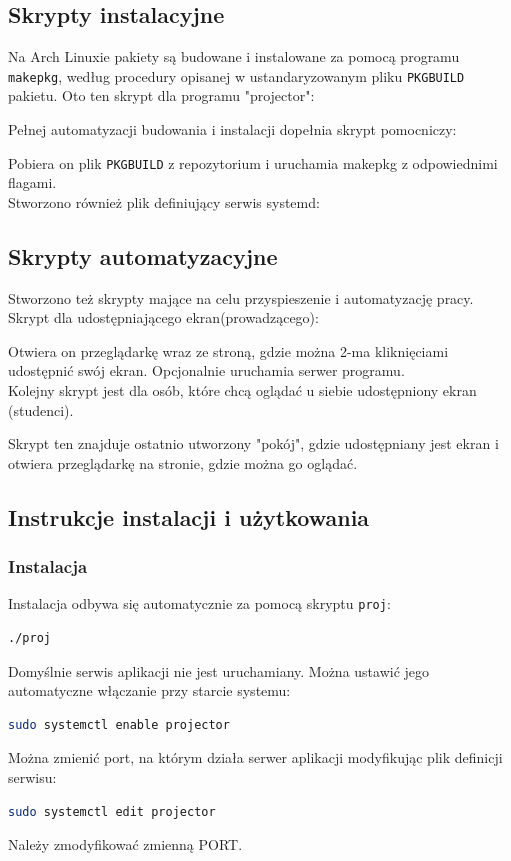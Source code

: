 \documentclass[a4paper,11pt]{article}
\begin{document}
        \subsection{Skrypty instalacyjne}
        Na Arch Linuxie pakiety są budowane i instalowane za pomocą programu \texttt{makepkg}, według procedury opisanej w ustandaryzowanym pliku \texttt{PKGBUILD} pakietu. 
        Oto ten skrypt dla programu "projector":
        
        \newpage
        Pełnej automatyzacji budowania i instalacji dopełnia skrypt pomocniczy:
        
        Pobiera on plik \texttt{PKGBUILD} z repozytorium i uruchamia makepkg z odpowiednimi flagami. 
        \\ Stworzono również plik definiujący serwis systemd:
        
        \subsection{Skrypty automatyzacyjne}
        Stworzono też skrypty mające na celu przyspieszenie i automatyzację pracy.
        Skrypt dla udostępniającego ekran(prowadzącego):
        
        Otwiera on przeglądarkę wraz ze stroną, gdzie można 2-ma kliknięciami udostępnić swój ekran. Opcjonalnie uruchamia serwer programu. 
        \\ Kolejny skrypt jest dla osób, które chcą oglądać u siebie udostępniony ekran (studenci).
        
        Skrypt ten znajduje ostatnio utworzony "pokój", gdzie udostępniany jest ekran i otwiera przeglądarkę na stronie, gdzie można go oglądać.
        \subsection{Instrukcje instalacji i użytkowania}
            \subsubsection{Instalacja}
            Instalacja odbywa się automatycznie za pomocą skryptu \texttt{proj}:
            \begin{lstlisting}[language=bash]
            ./proj
            \end{lstlisting}
            Domyślnie serwis aplikacji nie jest uruchamiany. Można ustawić jego automatyczne włączanie przy starcie systemu:
            \begin{lstlisting}[language=bash]
            sudo systemctl enable projector
            \end{lstlisting}
            Można zmienić port, na którym działa serwer aplikacji modyfikując plik definicji serwisu:
            \begin{lstlisting}[language=bash]
            sudo systemctl edit projector
            \end{lstlisting}
            Należy zmodyfikować zmienną PORT.
\end{document}
